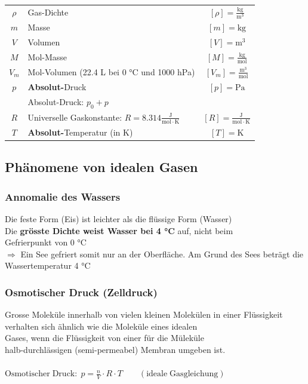 \begin{tabular}{c l c}
	\rule{0pt}{8pt}$\rho$ & Gas-Dichte & $[\rho] = \mathrm{\frac{kg}{m^3}}$ \\
	$m$ & Masse & $[m] = \mathrm{kg}$ \\
	$V$ & Volumen & $[V] = \mathrm{m^3}$ \\
	\rule{0pt}{8pt}$M$ & Mol-Masse & $[M] = \mathrm{\frac{kg}{mol}}$ \\
	\rule{0pt}{8pt}$V_m$ & Mol-Volumen (22.4 L bei 0 °C und 1000 hPa) & $[V_m] = \mathrm{\frac{m^3}{mol}}$ \\
	\rule{0pt}{8pt}$p$ & \textbf{Absolut-}Druck & $[p] = \mathrm{Pa}$ \\
	    & Absolut-Druck: $p_0 + p$ & \\
	\rule{0pt}{8pt}$R$ & Universelle Gaskonstante: $R = 8.314 \mathrm{\frac{J}{mol \cdot K}}$ & $[R] = \mathrm{\frac{J}{mol \cdot K}} $ \\
	$T$ & \textbf{Absolut-}Temperatur (in K) & $[T] = \mathrm{K}$ \\
\end{tabular}



\subsection{Phänomene von idealen Gasen}

\subsubsection{Annomalie des Wassers}
Die feste Form (Eis) ist leichter als die flüssige Form (Wasser) \\
Die \textbf{grösste Dichte weist Wasser bei 4 °C} auf, nicht beim \\
 Gefrierpunkt von 0 °C \\

$\Rightarrow$ Ein See gefriert somit nur an der Oberfläche. Am Grund des Sees beträgt die Wassertemperatur 4 °C 


\subsubsection{Osmotischer Druck (Zelldruck)}

Grosse Moleküle innerhalb von vielen kleinen Molekülen in einer Flüssigkeit verhalten sich ähnlich wie die Moleküle eines idealen \\ Gases, wenn die Flüssigkeit von einer für die Müleküle \\
halb-durchlässigen (semi-permeabel) Membran umgeben ist.\\
\\
$ \mathrm{Osmotischer \; Druck:} \; p = \frac{n}{V} \cdot R \cdot T  \qquad \mathrm{(ideale \; Gasgleichung)}$



